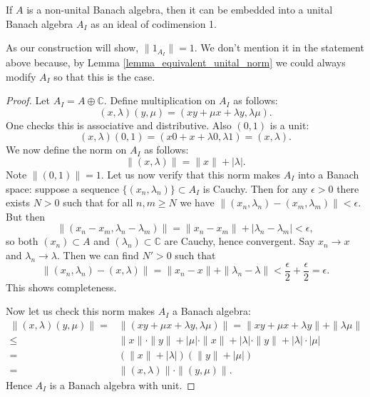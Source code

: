 \documentclass[12pt]{article}
\begin{document}
\begin{lemma}
	If $A$ is a non-unital Banach algebra, then it can be embedded into a unital Banach algebra $A_I$ as an ideal of codimension 1.
\end{lemma}

\begin{remark}
	As our construction will show, $\|1_{A_I}\| = 1$. We don't mention it in the statement above because, by Lemma \ref{lemma_equivalent_unital_norm} we could always modify $A_I$ so that this is the case.
\end{remark}

\begin{proof}
	Let $A_I = A \oplus \mathbb{C}$. Define multiplication on $A_I$ as follows: 
	\begin{equation*}
		(x,\lambda)(y,\mu) = (xy + \mu x + \lambda y, \lambda\mu).
	\end{equation*}
	One checks this is associative and distributive. Also $(0,1)$ is a unit:
	\begin{equation*}
		(x,\lambda)(0,1) = (x0 + x + \lambda 0, \lambda 1) = (x,\lambda).
	\end{equation*}
	We now define the norm on $A_I$ as follows: 
	\begin{equation*}
		\|(x,\lambda)\| = \|x\| + |\lambda|.
	\end{equation*}
	Note $\|(0,1)\| = 1$. Let us now verify that this norm makes $A_I$ into a Banach space: suppose a sequence $\{(x_n,\lambda_n)\}\subset A_I$ is Cauchy. Then for any $\epsilon>0$ there exists $N>0$ such that for all $n,m\geq N$ we have $\|(x_n,\lambda_n) - (x_m,\lambda_m)\| < \epsilon$. But then 
	\begin{equation*}
		\|(x_n - x_m, \lambda_n - \lambda_m)\| = \|x_n - x_m\| + |\lambda_n - \lambda_m| < \epsilon,
	\end{equation*}
	so both $(x_n)\subset A$ and $(\lambda_n)\subset \mathbb{C}$ are Cauchy, hence convergent. Say $x_n\to x$ and $\lambda_n\to \lambda$. Then we can find $N'>0$ such that 
	\begin{equation*}
		\|(x_n,\lambda_n) - (x,\lambda)\| = \|x_n-x\| + \|\lambda_n - \lambda\| < \frac{\epsilon}{2} + \frac{\epsilon}{2} = \epsilon.
	\end{equation*}
	This shows completeness.

	Now let us check this norm makes $A_I$ a Banach algebra:
	\begin{align*}
		\|(x,\lambda)(y,\mu)\|
		=& \|(xy + \mu x  +\lambda y, \lambda\mu)\| = \|xy + \mu x + \lambda y\| + \|\lambda\mu\| \\
		\leq& \|x\|\cdot\|y\| + |\mu|\cdot \|x\| + |\lambda| \cdot \|y\| + |\lambda|\cdot |\mu| \\
		=& (\|x\| + |\lambda|)(\|y\| + |\mu|) \\
		=& \|(x,\lambda)\|\cdot\|(y,\mu)\|.
	\end{align*}
	Hence $A_I$ is a Banach algebra with unit.


\end{proof}
\end{document}
